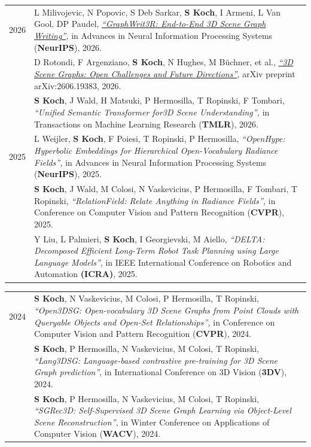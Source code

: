 \documentclass{article}
\makeatletter
\newcommand{\bodysize}{\fontsize{10.5}{13.49}\selectfont}
\newcommand{\compactsize}{\fontsize{10.5}{12.53}\selectfont}
\newcommand{\datesize}{\fontsize{9}{11.56}\selectfont}
\newlength{\dcw}   %
\newlength{\ccw}   %
\newcommand{\datebar}{\kern0.075in{\color{dategray}\vrule width 1pt}\kern0.075in}
\newcommand{\datestyle}{\raggedleft\arraybackslash\datesize\leavevmode\color{dategray}}
\newenvironment{cvtable}[2][\bodysize]{%
  \setlength{\dcw}{#2}%
  \setlength{\ccw}{\dimexpr\textwidth-\dcw-0.314in\relax}%
  \setlength{\LTpre}{3.2pt}\setlength{\LTpost}{0pt}%
  \setlength{\LTleft}{0pt}\setlength{\LTright}{\fill}%
  \setlength{\tabcolsep}{0pt}%
  \begin{longtable}{@{\kern0.075in}>{\datestyle}p{\dcw}!{\datebar}>{\raggedright\arraybackslash#1}p{\ccw}@{}}%
}{\end{longtable}\vspace{\entrygap}}
\newcommand{\pubitem}[1]{{\hangindent=0.221in \hangafter=1 \noindent#1\par}}
\newlength{\entrygap}\setlength{\entrygap}{4.6pt}
\makeatother
\begin{document}
\begin{cvtable}[\compactsize]{0.441in}
2026 &
  \pubitem{[1] L Milivojevic, N Popovic, S Deb Sarkar, \textbf{S Koch}, I Armeni, L Van Gool, DP Paudel, \textit{\href{https://graphwrit3r.insait.ai/}{``GraphWrit3R: End-to-End 3D Scene Graph Writing''},} in Advances in Neural Information Processing Systems (\textbf{NeurIPS}), 2026.}\\ \noalign{\vskip 2.6pt}
 &
  \pubitem{[2] D Rotondi, F Argenziano, \textbf{S Koch}, N Hughes, M Büchner, et al., \textit{\href{https://arxiv.org/abs/2606.19383}{``3D Scene Graphs: Open Challenges and Future Directions''},} arXiv preprint arXiv:2606.19383, 2026.}\\ \noalign{\vskip 2.6pt}
 &
  \pubitem{[3] \textbf{S Koch}, J Wald, H Matsuki, P Hermosilla, T Ropinski, F Tombari, \textit{``Unified Semantic Transformer for\newline 3D Scene Understanding'',} in Transactions on Machine Learning Research (\textbf{TMLR}), 2026.}\\ \noalign{\vskip 2.6pt}
2025 &
  \pubitem{[4] L Weijler, \textbf{S Koch}, F Poiesi, T Ropinski, P Hermosilla, \textit{``OpenHype: Hyperbolic Embeddings for Hierarchical Open-Vocabulary Radiance Fields'',} in Advances in Neural Information Processing Systems (\textbf{NeurIPS}), 2025.}\\ \noalign{\vskip 2.6pt}
 &
  \pubitem{[5] \textbf{S Koch}, J Wald, M Colosi, N Vaskevicius, P Hermosilla, F Tombari, T Ropinski, \textit{``RelationField: Relate Anything in Radiance Fields'',} in Conference on Computer Vision and Pattern Recognition (\textbf{CVPR}), 2025.}\\ \noalign{\vskip 2.6pt}
 &
  \pubitem{[6] Y Liu, L Palmieri, \textbf{S Koch}, I Georgievski, M Aiello, \textit{``DELTA: Decomposed Efficient Long-Term Robot Task Planning using Large Language Models''}, in IEEE International Conference on Robotics and Automation \textbf{(ICRA)}, 2025.}\\
\end{cvtable}

\begin{cvtable}[\compactsize]{0.441in}
2024 &
  \pubitem{[7] \textbf{S Koch}, N Vaskevicius, M Colosi, P Hermosilla, T Ropinski, \textit{``Open3DSG: Open-vocabulary 3D Scene Graphs from Point Clouds with Queryable Objects and Open-Set Relationships'',} in Conference on Computer Vision and Pattern Recognition (\textbf{CVPR}), 2024.}\\ \noalign{\vskip 2.6pt}
 &
  \pubitem{[8] \textbf{S Koch}, P Hermosilla, N Vaskevicius, M Colosi, T Ropinski, \textit{``Lang3DSG: Language-based contrastive pre-training for 3D Scene Graph prediction''}, in International Conference on 3D Vision (\textbf{3DV}), 2024.}\\ \noalign{\vskip 2.6pt}
 &
  \pubitem{[9] \textbf{S Koch}, P Hermosilla, N Vaskevicius, M Colosi, T Ropinski, \textit{``SGRec3D: Self-Supervised 3D Scene Graph Learning via Object-Level Scene Reconstruction'',} in Winter Conference on Applications of Computer Vision (\textbf{WACV}), 2024.}\\
\end{cvtable}
\end{document}
